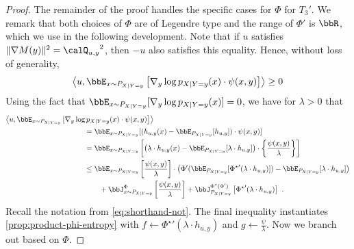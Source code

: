 \documentclass[11pt]{article}
\newcounter{ct}
\newcommand{\Phient}[3]{
    \ensuremath{\if$#3$\bbJ_{#1}^{#2}\else\bbJ_{#1}^{#2}\left[#3\right]\fi}}
\begin{document}
\begin{proof}
The remainder of the proof handles the specific cases for \(\Phi\) for \(T_{3}'\).
We remark that both choices of \(\Phi\) are of Legendre type and the range of \(\Phi'\) is \(\bbR\), which we use in the following development.
Note that if \(u\) satisfies \(\|\nabla M(y)\|^{2} = {\calQ_{u, y}}^{2}\), then \(-u\) also satisfies this equality.
Hence, without loss of generality,
\begin{equation*}
    \left\langle u, \bbE_{x \sim P_{X | Y = y}}\left[\nabla_{y}\log p_{X | Y = y}(x) \cdot \psi(x, y) \right]\right\rangle \geq 0
\end{equation*}
Using the fact that \(\bbE_{x \sim P_{X | Y = y}}[\nabla_{y}\log p_{X | Y = y}(x)] = 0\), we have for \(\lambda > 0\) that
\begin{align*}
    \left\langle u, \bbE_{x \sim P_{X | Y = y}}\left[\nabla_{y}\log  \!\!\right.\right. & \!\!\!\left.\left.\phantom{{}_{{}_{|}}} p_{X | Y = y}(x) \cdot\psi(x, y) \right]\right\rangle \\
    &= \bbE_{x \sim P_{X | Y = y}}[(h_{u, y}(x) - \bbE_{P_{X | Y = y}}[h_{u, y}]) \cdot \psi(x, y)] \\
    &= \bbE_{x \sim P_{X | Y = y}}\left[\left(\lambda \cdot h_{u, y}(x)- \bbE_{P_{X | Y= y}}[\lambda \cdot h_{u, y}]\right) \cdot \left\{\frac{\psi(x, y)}{\lambda}\right\} \right] \\
    &\leq \bbE_{x \sim P_{X | Y = y}}\left[\frac{\psi(x, y)}{\lambda}\right] \cdot \left(\Phi'(\bbE_{P_{X | Y =y}}[{\Phi^{\star}}'(\lambda \cdot h_{u, y})]) - \bbE_{P_{X | Y = y}}[\lambda \cdot h_{u, y}]\right) \\
    &\qquad + \Phient{x \sim P_{X | Y = y}}{\Phi}{\frac{\psi(x, y)}{\lambda}} + \Phient{P_{X | Y = y}}{\Phi^{\star}(\Phi')}{{\Phi^{\star}}'(\lambda \cdot h_{u, y})}~. 
\end{align*}
Recall the notation from \cref{eq:shorthand-not}.
The final inequality instantiates \cref{prop:product-phi-entropy} with \(f \leftarrow {\Phi^{\star}}'(\lambda \cdot h_{u, y})\) and \(g \leftarrow \frac{\psi}{\lambda}\).
Now we branch out based on \(\Phi\).


\end{proof}
\end{document}
